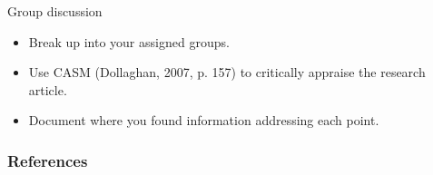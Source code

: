 \documentclass{beamer}
\begin{document}
% 
\begin{frame}{Group discussion}
	\begin{itemize}
	\item Break up into your assigned groups.
	\item Use CASM (Dollaghan, 2007, p. 157) to critically appraise the research article.
	\item Document \alert{where} you found information addressing each point.
	\end{itemize}
\end{frame}

%
\begin{frame}%
	\frametitle{References}
	
	\small
\end{frame}
\end{document}
